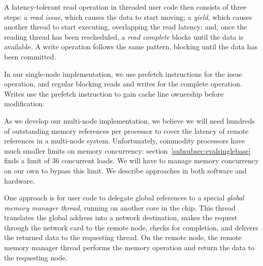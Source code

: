 \documentclass[10pt,nocopyrightspace]{sigplanconf}
\begin{document}
A latency-tolerant read operation in threaded user code then consists of three steps: a {\em read
  issue}, which causes the data to start moving; a {\em yield}, which
causes another thread to start executing, overlapping the read
latency; and, once the reading thread has been rescheduled, a {\em
  read complete} blocks until the data is available. A write operation
follows the same pattern, blocking until the data has been committed.

In our single-node implementation, we use prefetch instructions for
the issue operation, and regular blocking reads and writes for the
complete operation. 
Writes use the prefetch instruction to gain
cache line ownership before modification.

As we develop our multi-node implementation, we believe we will need hundreds of outstanding memory references per
processor to cover the latency of remote references in a multi-node
system. Unfortunately, commodity processors have much smaller limits
on memory concurrency: section~\ref{subsubsec:evalsinglebase} finds a
limit of 36 concurrent loads. We will have to manage memory
concurrency on our own to bypass this limit. We describe approaches in
both software and hardware.

One approach is for user code to delegate global references to a
special {\em global memory manager thread}, running on another core in
the chip. This thread translates the global address into a network
destination, makes the request through the network card to the remote
node, checks for completion, and delivers the returned data to the
requesting thread. On the remote node, the remote memory manager
thread performs the memory operation and return the data to the
requesting node.

\end{document}
